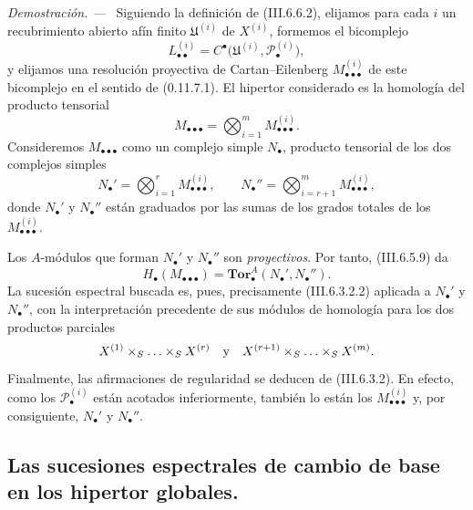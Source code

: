 \documentclass[10pt,oneside]{book}
\newcommand{\sh}[1]{\mathscr{#1}}
\newcommand{\sref}[2][]{\textup{(#2)}}
\newcommand{\oldpage}[2][]{\setcounter{footnote}{0}\marginpar{\scriptsize\textbf{#1}~|~#2}\ignorespaces}
\newenvironment{proof}{\par\medskip\noindent\textit{Demostración. ---\ }}{\par}
\begin{document}
\begin{proof}
Siguiendo la definición de \sref{III.6.6.2}, elijamos para cada
$i$ un recubrimiento abierto afín finito $\mathfrak U^{(i)}$ de
$X^{(i)}$, formemos el bicomplejo
\[
  L_{\bullet\bullet}^{(i)}
  =
  C^\bullet
  \bigl(
    \mathfrak U^{(i)},\sh P_\bullet^{(i)}
  \bigr),
\]
y elijamos una resolución proyectiva de Cartan--Eilenberg
$M_{\bullet\bullet\bullet}^{(i)}$ de este bicomplejo en el sentido
de \sref[0]{0.11.7.1}. El hipertor considerado es la homología del
producto tensorial
\[
  M_{\bullet\bullet\bullet}
  =
  \bigotimes_{i=1}^{m}
  M_{\bullet\bullet\bullet}^{(i)}.
\]
Consideremos $M_{\bullet\bullet\bullet}$ como un complejo simple
$N_\bullet$, producto tensorial de los dos complejos simples
\[
  N_\bullet'
  =
  \bigotimes_{i=1}^{r}
  M_{\bullet\bullet\bullet}^{(i)},
  \qquad
  N_\bullet''
  =
  \bigotimes_{i=r+1}^{m}
  M_{\bullet\bullet\bullet}^{(i)},
\]
donde $N_\bullet'$ y $N_\bullet''$ están graduados por las sumas
de los grados totales de los $M_{\bullet\bullet\bullet}^{(i)}$.

Los $A$-módulos que forman $N_\bullet'$ y $N_\bullet''$ son
\emph{proyectivos}. Por tanto, \sref{III.6.5.9} da
\[
  H_\bullet(M_{\bullet\bullet\bullet})
  =
  \mathbf{Tor}_\bullet^A(N_\bullet',N_\bullet'').
\]
La sucesión espectral buscada es, pues, precisamente
\sref{III.6.3.2.2} aplicada a $N_\bullet'$ y $N_\bullet''$, con
la interpretación precedente de sus módulos de homología para los
dos productos parciales
\[
  X^{(1)}\times_S\ldots\times_SX^{(r)}
  \quad\hbox{y}\quad
  X^{(r+1)}\times_S\ldots\times_SX^{(m)}.
\]
Finalmente, las afirmaciones de regularidad se deducen de
\sref{III.6.3.2}. En efecto, como los
$\sh P_\bullet^{(i)}$ están acotados inferiormente, también lo
están los $M_{\bullet\bullet\bullet}^{(i)}$ y, por consiguiente,
$N_\bullet'$ y $N_\bullet''$.
\end{proof}

\oldpage[III]{166}


\subsection{Las sucesiones espectrales de cambio de base en los hipertor
globales.}
\label{subsection:III.6.9}
\label{III.6.9}
\end{document}
